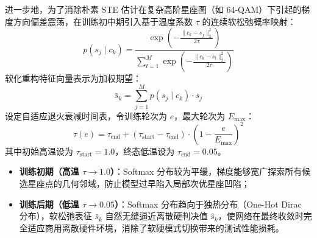 进一步地，为了消除朴素 STE 估计在复杂高阶星座图（如 64-QAM）下引起的梯度方向偏差震荡，在训练初中期引入基于温度系数 $\tau$ 的连续软松弛概率映射：
\begin{equation}
  p(s_j \mid c_k) = \frac{\exp\left( - \frac{\|c_k - s_j\|_2^2}{2\tau} \right)}{\sum_{l=1}^M \exp\left( - \frac{\|c_k - s_l\|_2^2}{2\tau} \right)}
  \label{eq:softmax_relaxation}
\end{equation}
软化重构特征向量表示为加权期望：
\begin{equation}
  \bar{s}_k = \sum_{j=1}^M p(s_j \mid c_k) \cdot s_j
  \label{eq:soft_expected_symbol}
\end{equation}
设定自适应退火衰减时间表，令训练轮次为 $e$，最大轮次为 $E_{\text{max}}$：
\begin{equation}
  \tau(e) = \tau_{\text{end}} + (\tau_{\text{start}} - \tau_{\text{end}}) \cdot \left( 1 - \frac{e}{E_{\text{max}}} \right)^2
  \label{eq:temperature_annealing_schedule}
\end{equation}
其中初始高温设为 $\tau_{\text{start}} = 1.0$，终态低温设为 $\tau_{\text{end}} = 0.05$。

\begin{itemize}
  \item \textbf{训练初期（高温 $\tau \to 1.0$）}：Softmax 分布较为平缓，梯度能够宽广探索所有候选星座点的几何邻域，防止模型过早陷入局部次优星座凹陷；
  \item \textbf{训练后期（低温 $\tau \to 0.05$）}：Softmax 分布趋向于独热分布（One-Hot Dirac 分布），软松弛表征 $\bar{s}_k$ 自然无缝逼近离散硬判决值 $\hat{s}_k$，使网络在最终收敛时完全适应商用离散硬件环境，消除了软硬模式切换带来的测试性能损耗。
\end{itemize}

